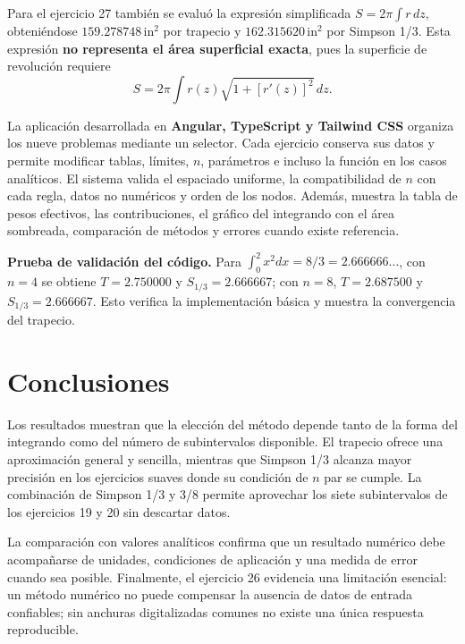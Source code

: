 \documentclass[10pt,letterpaper,oneside]{article}
\begin{document}
Para el ejercicio 27 también se evaluó la expresión simplificada
$S=2\pi\int r\,dz$, obteniéndose $159.278748\,\mathrm{in}^2$ por trapecio y
$162.315620\,\mathrm{in}^2$ por Simpson 1/3. Esta expresión \textbf{no representa
el área superficial exacta}, pues la superficie de revolución requiere
\[
S=2\pi\int r(z)\sqrt{1+[r'(z)]^2}\,dz.
\]

La aplicación desarrollada en \textbf{Angular, TypeScript y Tailwind CSS} organiza
los nueve problemas mediante un selector. Cada ejercicio conserva sus datos y
permite modificar tablas, límites, $n$, parámetros e incluso la función en los
casos analíticos. El sistema valida el espaciado uniforme, la compatibilidad de
$n$ con cada regla, datos no numéricos y orden de los nodos. Además, muestra la
tabla de pesos efectivos, las contribuciones, el gráfico del integrando con el
área sombreada, comparación de métodos y errores cuando existe referencia.

\begin{resultado}
\textbf{Prueba de validación del código.} Para
$\int_0^2 x^2dx=8/3=2.666666\ldots$, con $n=4$ se obtiene
$T=2.750000$ y $S_{1/3}=2.666667$; con $n=8$, $T=2.687500$ y
$S_{1/3}=2.666667$. Esto verifica la implementación básica y muestra la
convergencia del trapecio.
\end{resultado}

\section{Conclusiones}
Los resultados muestran que la elección del método depende tanto de la forma del
integrando como del número de subintervalos disponible. El trapecio ofrece una
aproximación general y sencilla, mientras que Simpson 1/3 alcanza mayor precisión
en los ejercicios suaves donde su condición de $n$ par se cumple. La combinación
de Simpson 1/3 y 3/8 permite aprovechar los siete subintervalos de los ejercicios
19 y 20 sin descartar datos.

La comparación con valores analíticos confirma que un resultado numérico debe
acompañarse de unidades, condiciones de aplicación y una medida de error cuando
sea posible. Finalmente, el ejercicio 26 evidencia una limitación esencial: un
método numérico no puede compensar la ausencia de datos de entrada confiables;
sin anchuras digitalizadas comunes no existe una única respuesta reproducible.
\end{document}

